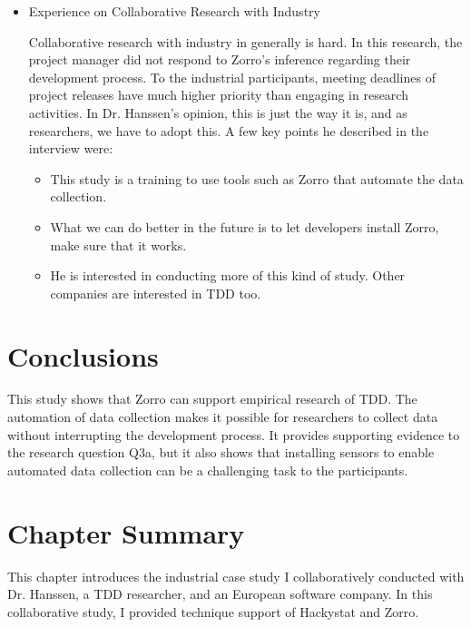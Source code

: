 \begin{itemize}
\item {Experience on Collaborative Research with Industry}

Collaborative research with industry in generally is hard. In this research, the project manager did not respond to Zorro's inference regarding their development process. To the industrial participants, meeting deadlines of project releases have much higher priority than engaging in research activities. In Dr. Hanssen's opinion, this is just the way it is, and as researchers, we have to adopt this. A few key points he described in the interview were:
\begin{itemize}
\item This study is a training to use tools such as Zorro that automate the data collection. 
\item What we can do better in the future is to let developers install Zorro, make sure that it works.
\item He is interested in conducting more of this kind of study. Other companies are interested in TDD too. 
\end{itemize}
\end{itemize}

\section{Conclusions}
\label{sec:Industry-Conclusions}

This study shows that Zorro can support empirical research of TDD. The automation of data collection makes it possible for researchers to collect data without interrupting the development process. It provides supporting evidence to the research question Q3a, but it also shows that installing sensors to enable automated data collection can be a challenging task to the participants. 

\section{Chapter Summary}
\label{sec:Industry-Summary}

This chapter introduces the industrial case study I collaboratively conducted with Dr. Hanssen, a TDD researcher, and an European software company. In this collaborative study, I provided technique support of Hackystat and Zorro. %

